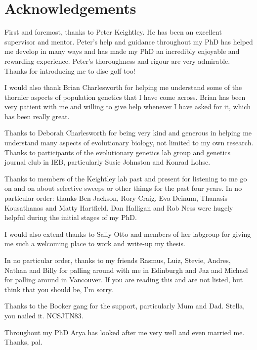 \chapter{Acknowledgements}

First and foremost, thanks to Peter Keightley. He has been an excellent supervisor and mentor. Peter's help and guidance throughout my PhD has helped me develop in many ways and has made my PhD an incredibly enjoyable and rewarding experience. Peter's thoroughness and rigour are very admirable. Thanks for introducing me to disc golf too!

I would also thank Brian Charlesworth for helping me understand some of the thornier aspects of population genetics that I have come across. Brian has been very patient with me and willing to give help whenever I have asked for it, which has been really great.

Thanks to Deborah Charlesworth for being very kind and generous in helping me understand many aspects of evolutionary biology, not limited to my own research. Thanks to participants of the evolutionary genetics lab group and genetics journal club in IEB, particularly Susie Johnston and Konrad Lohse.

Thanks to members of the Keightley lab past and present for listening to me go on and on about selective sweeps or other things for the past four years. In no particular order: thanks Ben Jackson, Rory Craig, Eva Deinum, Thanasis Kousathanas and Matty Hartfield. Dan Halligan and Rob Ness were hugely helpful during the initial stages of my PhD.

I would also extend thanks to Sally Otto and members of her labgroup for giving me such a welcoming place to work and write-up my thesis.

In no particular order, thanks to my friends Rasmus, Luiz, Stevie, Andres, Nathan and Billy for palling around with me in Edinburgh and Jaz and Michael for palling around in Vancouver. If you are reading this and are not listed, but think that you should be, I'm sorry.

Thanks to the Booker gang for the support, particularly Mum and Dad. Stella, you nailed it. NCSJTN83.

Throughout my PhD Arya has looked after me very well and even married me. Thanks, pal.